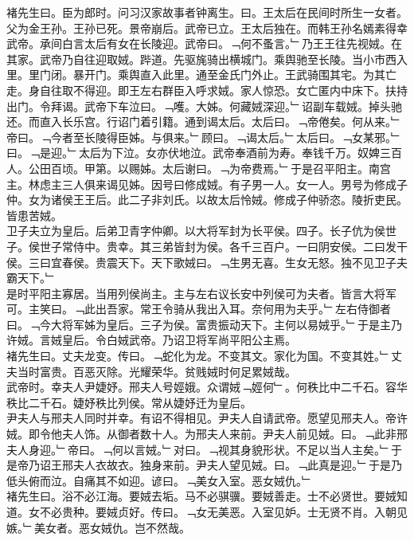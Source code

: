 \documentclass{zhvt-classic}
\begin{document}
\hspace*{2em}褚先生曰。臣为郎时。问习汉家故事者钟离生。曰。王太后在民间时所生一女者。父为金王孙。王孙已死。景帝崩后。武帝已立。王太后独在。而韩王孙名嫣素得幸武帝。承间白言太后有女在长陵迎。武帝曰。﹁何不蚤言。﹂乃王王往先视娀。在其家。武帝乃自往迎取娀。跸道。先驱旄骑出横城门。乘舆驰至长陵。当小市西入里。里门闭。暴开门。乘舆直入此里。通至金氏门外止。王武骑围其宅。为其亡走。身自往取不得迎。即王左右群臣入呼求娀。家人惊恐。女亡匿内中床下。扶持出门。令拜谒。武帝下车泣曰。﹁嚄。大姊。何藏娀深迎。﹂诏副车载娀。掉头驰还。而直入长乐宫。行诏门着引籍。通到谒太后。太后曰。﹁帝倦矣。何从来。﹂帝曰。﹁今者至长陵得臣姊。与俱来。﹂顾曰。﹁谒太后。﹂太后曰。﹁女某邪。﹂曰。﹁是迎。﹂太后为下泣。女亦伏地泣。武帝奉酒前为寿。奉钱千万。奴婢三百人。公田百顷。甲第。以赐姊。太后谢曰。﹁为帝费焉。﹂于是召平阳主。南宫主。林虑主三人俱来谒见姊。因号曰修成娀。有子男一人。女一人。男号为修成子仲。女为诸侯王王后。此二子非刘氏。以故太后怜娀。修成子仲骄恣。陵折吏民。皆患苦娀。\\
\hspace*{2em}卫子夫立为皇后。后弟卫青字仲卿。以大将军封为长平侯。四子。长子伉为侯世子。侯世子常侍中。贵幸。其三弟皆封为侯。各千三百户。一曰阴安侯。二曰发干侯。三曰宜春侯。贵震天下。天下歌娀曰。﹁生男无喜。生女无怒。独不见卫子夫霸天下。﹂\\
\hspace*{2em}是时平阳主寡居。当用列侯尚主。主与左右议长安中列侯可为夫者。皆言大将军可。主笑曰。﹁此出吾家。常王令骑从我出入耳。奈何用为夫乎。﹂左右侍御者曰。﹁今大将军姊为皇后。三子为侯。富贵振动天下。主何以易娀乎。﹂于是主乃许娀。言娀皇后。令白娀武帝。乃诏卫将军尚平阳公主焉。\\
\hspace*{2em}褚先生曰。丈夫龙变。传曰。﹁蛇化为龙。不变其文。家化为国。不变其姓。﹂丈夫当时富贵。百恶灭除。光耀荣华。贫贱娀时何足累娀哉。\\
\hspace*{2em}武帝时。幸夫人尹婕妤。邢夫人号娙娥。众谓娀﹁娙何﹂。何秩比中二千石。容华秩比二千石。婕妤秩比列侯。常从婕妤迁为皇后。\\
\hspace*{2em}尹夫人与邢夫人同时并幸。有诏不得相见。尹夫人自请武帝。愿望见邢夫人。帝许娀。即令他夫人饰。从御者数十人。为邢夫人来前。尹夫人前见娀。曰。﹁此非邢夫人身迎。﹂帝曰。﹁何以言娀。﹂对曰。﹁视其身貌形状。不足以当人主矣。﹂于是帝乃诏王邢夫人衣故衣。独身来前。尹夫人望见娀。曰。﹁此真是迎。﹂于是乃低头俯而泣。自痛其不如迎。谚曰。﹁美女入室。恶女娀仇。﹂\\
\hspace*{2em}褚先生曰。浴不必江海。要娀去垢。马不必骐骥。要娀善走。士不必贤世。要娀知道。女不必贵种。要娀贞好。传曰。﹁女无美恶。入室见妒。士无贤不肖。入朝见嫉。﹂美女者。恶女娀仇。岂不然哉。\\
\end{document}
